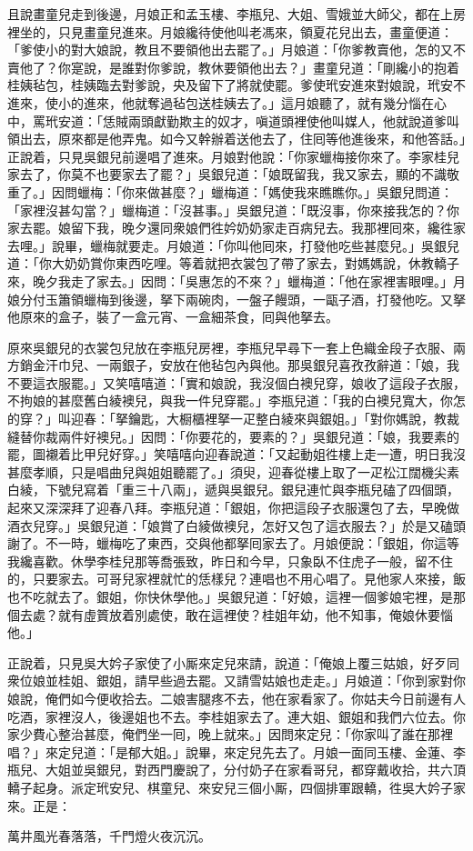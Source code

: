 且說畫童兒走到後邊，月娘正和孟玉樓、李瓶兒、大姐、雪娥並大師父，都在上房裡坐的，只見畫童兒進來。月娘纔待使他叫老馮來，領夏花兒出去，畫童便道：「爹使小的對大娘說，教且不要領他出去罷了。」月娘道：「你爹教賣他，怎的又不賣他了？你寔說，是誰對你爹說，教休要領他出去？」畫童兒道：「剛纔小的抱着桂姨毡包，桂姨臨去對爹說，央及留下了將就使罷。爹使玳安進來對娘說，玳安不進來，使小的進來，他就奪過毡包送桂姨去了。」這月娘聽了，就有幾分惱在心中，罵玳安道：「恁賊兩頭獻勤欺主的奴才，嗔道頭裡使他叫媒人，他就說道爹叫領出去，原來都是他弄鬼。如今又幹辦着送他去了，住囘等他進後來，和他答話。」正說着，只見吳銀兒前邊唱了進來。月娘對他說：「你家蠟梅接你來了。李家桂兒家去了，你莫不也要家去了罷？」吳銀兒道：「娘既留我，我又家去，顯的不識敬重了。」因問蠟梅：「你來做甚麼？」蠟梅道：「媽使我來瞧瞧你。」吳銀兒問道：「家裡沒甚勾當？」蠟梅道：「沒甚事。」吳銀兒道：「既沒事，你來接我怎的？你家去罷。娘留下我，晚夕還同衆娘們徃妗奶奶家走百病兒去。我那裡囘來，纔徃家去哩。」說畢，蠟梅就要走。月娘道：「你叫他囘來，打發他吃些甚麼兒。」吳銀兒道：「你大奶奶賞你東西吃哩。等着就把衣裳包了帶了家去，對媽媽說，休教轎子來，晚夕我走了家去。」因問：「吳惠怎的不來？」蠟梅道：「他在家裡害眼哩。」月娘分付玉簫領蠟梅到後邊，拏下兩碗肉，一盤子饅頭，一甌子酒，打發他吃。又拏他原來的盒子，裝了一盒元宵、一盒細茶食，囘與他拏去。

原來吳銀兒的衣裳包兒放在李瓶兒房裡，李瓶兒早尋下一套上色織金段子衣服、兩方銷金汗巾兒、一兩銀子，安放在他毡包內與他。那吳銀兒喜孜孜辭道：「娘，我不要這衣服罷。」又笑嘻嘻道：「實和娘說，我沒個白襖兒穿，娘收了這段子衣服，不拘娘的甚麼舊白綾襖兒，與我一件兒穿罷。」李瓶兒道：「我的白襖兒寬大，你怎的穿？」叫迎春：「拏鑰匙，大橱櫃裡拏一疋整白綾來與銀姐。」「對你媽說，教裁縫替你裁兩件好襖兒。」因問：「你要花的，要素的？」吳銀兒道：「娘，我要素的罷，圖襯着比甲兒好穿。」笑嘻嘻向迎春說道：「又起動姐徃樓上走一遭，明日我沒甚麼孝順，只是唱曲兒與姐姐聽罷了。」須臾，迎春從樓上取了一疋松江闊機尖素白綾，下號兒寫着「重三十八兩」，遞與吳銀兒。銀兒連忙與李瓶兒磕了四個頭，起來又深深拜了迎春八拜。李瓶兒道：「銀姐，你把這段子衣服還包了去，早晚做酒衣兒穿。」吳銀兒道：「娘賞了白綾做襖兒，怎好又包了這衣服去？」於是又磕頭謝了。不一時，蠟梅吃了東西，交與他都拏囘家去了。月娘便說：「銀姐，你這等我纔喜歡。休學李桂兒那等喬張致，昨日和今早，只象臥不住虎子一般，留不住的，只要家去。可哥兒家裡就忙的恁樣兒？連唱也不用心唱了。見他家人來接，飯也不吃就去了。銀姐，你快休學他。」吳銀兒道：「好娘，這裡一個爹娘宅裡，是那個去處？就有虛篢放着別處使，敢在這裡使？桂姐年幼，他不知事，俺娘休要惱他。」{}

正說着，只見吳大妗子家使了小厮來定兒來請，說道：「俺娘上覆三姑娘，好歹同衆位娘並桂姐、銀姐，請早些過去罷。又請雪姑娘也走走。」月娘道：「你到家對你娘說，俺們如今便收拾去。二娘害腿疼不去，他在家看家了。你姑夫今日前邊有人吃酒，家裡沒人，後邊姐也不去。李桂姐家去了。連大姐、銀姐和我們六位去。你家少費心整治甚麼，俺們坐一囘，晚上就來。」因問來定兒：「你家叫了誰在那裡唱？」來定兒道：「是郁大姐。」說畢，來定兒先去了。月娘一面同玉樓、金蓮、李瓶兒、大姐並吳銀兒，對西門慶說了，分付奶子在家看哥兒，都穿戴收拾，共六頂轎子起身。派定玳安兒、棋童兒、來安兒三個小厮，四個排軍跟轎，徃吳大妗子家來。正是：

萬井風光春落落，千門燈火夜沉沉。

